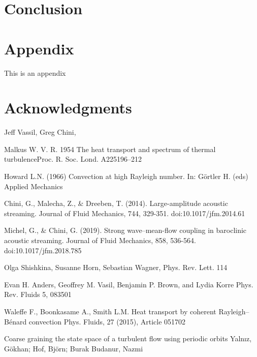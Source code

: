 \documentclass[reprint,amsmath,amssymb,aps]{revtex4-1}
\begin{document}
\section{Conclusion}\label{sec:conclusion}

\section*{Appendix}
This is an appendix

\section*{Acknowledgments}
Jeff Vassil, Greg Chini, 

% 
\begin{thebibliography}{99} 

 Malkus W. V. R. 1954 The heat transport and spectrum of thermal turbulenceProc. R. Soc. Lond. A225196–212

 Howard L.N. (1966) Convection at high Rayleigh number. In: Görtler H. (eds) Applied Mechanics

 Chini, G., Malecha, Z., \& Dreeben, T. (2014). Large-amplitude acoustic streaming. Journal of Fluid Mechanics, 744, 329-351. doi:10.1017/jfm.2014.61

 Michel, G., \& Chini, G. (2019). Strong wave–mean-flow coupling in baroclinic acoustic streaming. Journal of Fluid Mechanics, 858, 536-564. doi:10.1017/jfm.2018.785

 Olga Shishkina, Susanne Horn, Sebastian Wagner, Phys. Rev. Lett. 114

 Evan H. Anders, Geoffrey M. Vasil, Benjamin P. Brown, and Lydia Korre Phys. Rev. Fluids 5, 083501

 Waleffe F., Boonkasame A., Smith L.M. Heat transport by coherent Rayleigh–Bénard convection Phys. Fluids, 27 (2015), Article 051702

 Coarse graining the state space of a turbulent flow using periodic orbits Yalnız, Gökhan; Hof, Björn; Burak Budanur, Nazmi

\end{thebibliography}
\end{document}
